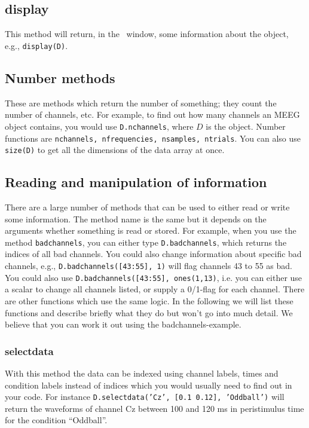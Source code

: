 \subsection{display}
This method will return, in the \matlab\ window, some information about the object, e.g., \texttt{display(D)}.

\subsection{Number methods}
These are methods which return the number of something; they count the number of channels, etc. For example, to find out how many channels an MEEG object contains, you would use \texttt{D.nchannels}, where $D$ is the object. Number functions are \texttt{nchannels, nfrequencies, nsamples, ntrials}. You can also use \texttt{size(D)} to get all the dimensions of the data array at once.

\subsection{Reading and manipulation of information}
There are a large number of methods that can be used to either read or write some information. The method name is the same but it depends on the arguments whether something is read or stored. For example, when you use the method \texttt{badchannels}, you can either type \texttt{D.badchannels}, which returns the indices of all bad channels. You could also change information about specific bad channels, e.g., \texttt{D.badchannels([43:55], 1)} will flag channels 43 to 55 as bad. You   could also use \texttt{D.badchannels([43:55], ones(1,13)}, i.e. you can either use a scalar to change all channels listed, or supply a 0/1-flag for each channel. There are other functions which use the same logic. In the following we will list these functions and describe briefly what they do but won't go into much detail. We believe that you can work it out using the badchannels-example.

\subsubsection{selectdata}
With this method the data can be indexed using channel labels, times and condition labels instead of indices which you would usually need to find out in your code. For instance \texttt{D.selectdata('Cz', [0.1 0.12], 'Oddball')} will return the waveforms of channel Cz between 100 and 120 ms in peristimulus time for the condition ``Oddball''.

